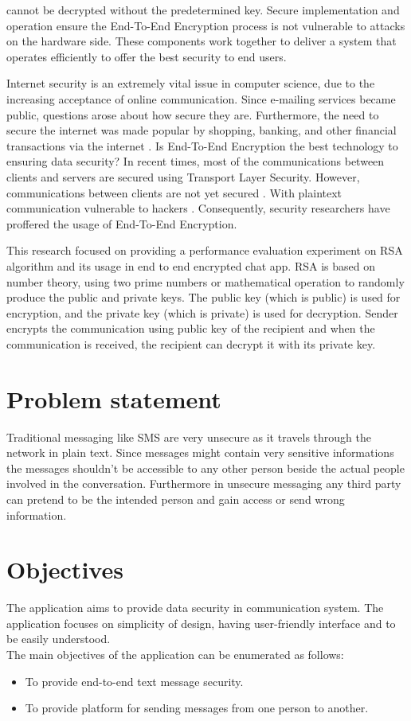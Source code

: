 cannot be decrypted without the predetermined key. Secure
implementation and operation ensure the End-To-End
Encryption process is not vulnerable to attacks on the
hardware side. These components work together to deliver a
system that operates efficiently to offer the best security to
end users.\par
Internet security is an extremely vital issue in computer
science, due to the increasing acceptance of online
communication. Since e-mailing services became public,
questions arose about how secure they are. Furthermore, the
need to secure the internet was made popular by shopping,
banking, and other financial transactions via the internet .
Is End-To-End Encryption the best technology to ensuring
data security? In recent times, most of the communications
between clients and servers are secured using Transport
Layer Security. However, communications between clients
are not yet secured . With plaintext communication
vulnerable to hackers . Consequently, security
researchers have proffered the usage of End-To-End
Encryption.\par
This research focused on providing a performance
evaluation experiment on RSA algorithm and its usage in end to end encrypted
chat app. RSA is based
on number theory, using two prime numbers or
mathematical operation to randomly produce the public and
private keys. The public key (which is public) is used for
encryption, and the private key (which is private) is used for
decryption. Sender encrypts the communication using public
key of the recipient and when the communication is
received, the recipient can decrypt it with its private key.\cite{paley}


\pagebreak
\section{Problem statement}
\vspace{-18pt}
Traditional messaging like SMS are very unsecure as it travels through the network in plain text. Since messages might contain very sensitive informations the messages shouldn't be accessible to any other person beside the actual people involved in the conversation. Furthermore in unsecure messaging any third party can pretend to be the intended person and gain access or send wrong information.


\section{Objectives}
The application aims to provide data security in communication system. The application focuses on
simplicity of design, having user-friendly interface and to be easily understood. \\
The main objectives of the application can be enumerated as follows:
\vspace{-18pt}
\begin{itemize}
	\item To provide end-to-end text message security.
	\item To provide platform for sending messages from one person to another.
\end{itemize}

